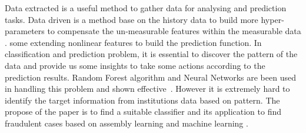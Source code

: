 Data extracted is a useful method to gather data for analysing and prediction tasks. Data driven is a method base on the history data to build more hyper-parameters to compensate the un-measurable features within the measurable data \cite{SMARRA20181252}. some extending nonlinear features to build the prediction function. In classification and prediction problem, it is essential to discover the pattern of the data and provide us some insights to take some actions according to the prediction results. Random Forest algorithm and Neural Networks are been used in handling this problem and shown effective~\cite{10.1145/3414274.3414278, RB2021}. However it is extremely hard to identify the target information from institutions data based on pattern. The propose of the paper is to find a suitable classifier and its application to find fraudulent cases based on assembly learning and machine learning .













